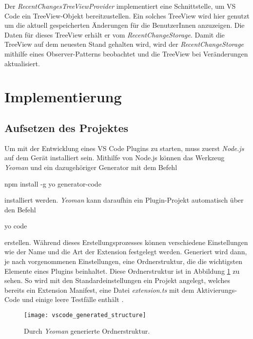 Der \emph{RecentChangesTreeViewProvider} implementiert eine Schnittstelle,
um VS Code ein TreeView-Objekt bereitzustellen. Ein solches TreeView
wird hier genutzt um die aktuell gespeicherten Änderungen
für die BenutzerInnen anzuzeigen.
Die Daten für dieses TreeView
erhält er vom \emph{RecentChangeStorage}. Damit die TreeView auf dem neuesten Stand
gehalten wird, wird der \emph{RecentChangeStorage} mithilfe eines Observer-Patterns \cite{2005Dp:e}
beobachtet und die TreeView bei Veränderungen aktualisiert.


\section{Implementierung}
\label{sec:EntwicklungVsCode_Implementierung}

\subsection{Aufsetzen des Projektes}

Um mit der Entwicklung eines VS Code Plugins zu starten, muss zuerst \emph{Node.js} \cite{NodeJSWebsite}
auf dem Gerät installiert sein. Mithilfe von Node.js können das Werkzeug
\emph{Yeoman} \cite{YeomanWebsite} und ein dazugehöriger Generator mit dem Befehl
\begin{GenericCode}[numbers=none]
    npm install -g yo generator-code
\end{GenericCode}
installiert werden.
\emph{Yeoman} kann daraufhin ein Plugin-Projekt automatisch über den Befehl
\begin{GenericCode}[numbers=none]
    yo code
\end{GenericCode}
erstellen. Während dieses Erstellungsprozesses können verschiedene Einstellungen
wie der Name und die Art der Extension festgelegt werden. Generiert wird dann,
je nach vorgenommenen Einstellungen, eine Ordnerstruktur, die die wichtigsten
Elemente eines Plugins beinhaltet. Diese Ordnerstruktur ist in Abbildung 
\ref{fig:vscode_generated_structure} zu sehen.
So wird mit den Standardeinstellungen
ein Projekt angelegt, welches bereits ein Extension Manifest, eine Datei 
\emph{extension.ts} mit dem Aktivierungs-Code und einige leere Testfälle enthält
\cite{VSCodeExtensionAPIYourFirstExtension}.

\begin{figure}
    \centering
    \texttt{[image: vscode\_generated\_structure]}
    \caption{Durch \emph{Yeoman} generierte Ordnerstruktur.}
    \label{fig:vscode_generated_structure}
\end{figure}   

